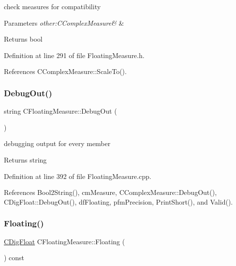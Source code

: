 check measures for compatibility 


\begin{DoxyParams}{Parameters}
{\em other\+:\+C\+Complex\+Measure\&} & \\
\hline
\end{DoxyParams}
\begin{DoxyReturn}{Returns}
bool 
\end{DoxyReturn}


Definition at line 291 of file Floating\+Measure.\+h.



References C\+Complex\+Measure\+::\+Scale\+To().

\mbox{\label{classCFloatingMeasure_a6d92f39204f23e81732cb77131517b6f}} 
\subsubsection{\texorpdfstring{Debug\+Out()}{DebugOut()}}
{\footnotesize\ttfamily string C\+Floating\+Measure\+::\+Debug\+Out (\begin{DoxyParamCaption}{ }\end{DoxyParamCaption})}



debugging output for every member 

\begin{DoxyReturn}{Returns}
string 
\end{DoxyReturn}


Definition at line 392 of file Floating\+Measure.\+cpp.



References Bool2\+String(), cm\+Measure, C\+Complex\+Measure\+::\+Debug\+Out(), C\+Dig\+Float\+::\+Debug\+Out(), df\+Floating, pfm\+Precision, Print\+Short(), and Valid().

\mbox{\label{classCFloatingMeasure_ab41354d28783d125159bd6e9372c6d9f}} 
\subsubsection{\texorpdfstring{Floating()}{Floating()}\hspace{0.1cm}{\footnotesize\ttfamily [1/2]}}
{\footnotesize\ttfamily \hyperlink{classCDigFloat}{C\+Dig\+Float} C\+Floating\+Measure\+::\+Floating (\begin{DoxyParamCaption}{ }\end{DoxyParamCaption}) const\hspace{0.3cm}{\ttfamily [inline]}}



